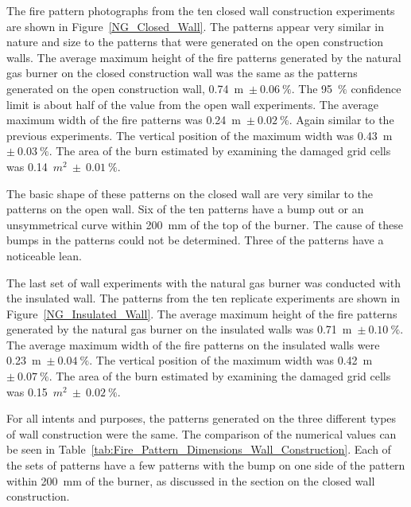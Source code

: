 \documentclass[twoside]{uocthesis}
\begin{document}
The fire pattern photographs from the ten closed wall construction experiments are shown in Figure~\ref{NG_Closed_Wall}. 
The patterns appear very similar in nature and size to the patterns that were generated on the open construction walls.  The average maximum height of the fire patterns generated by the natural gas burner on the closed construction wall was the same as the patterns generated on the open construction wall, 0.74~m~$\pm~0.06~\%$.  The 95~$\%$ confidence limit is about half of the value from the open wall experiments. The average maximum width of the fire patterns was 0.24~m~$\pm~0.02~\%$.  Again similar to the previous experiments. The vertical position of the maximum width was 0.43~m~$\pm~0.03~\%$. The area of the burn estimated by examining the damaged grid cells was 0.14~$m^2~\pm~0.01~\%$.  

The basic shape of these patterns on the closed wall are very similar to the patterns on the open wall.  Six of the ten patterns have a bump out or an unsymmetrical curve within 200~mm of the top of the burner.  The cause of these bumps in the patterns could not be determined. Three of the patterns have a noticeable lean.     
  
The last set of wall experiments with the natural gas burner was conducted with the insulated wall.  The patterns from the ten replicate experiments are shown in Figure~\ref{NG_Insulated_Wall}.  The average maximum height of the fire patterns generated by the natural gas burner on the insulated walls was 0.71~m~$\pm~0.10~\%$.  The average maximum width of the fire patterns on the insulated walls were 0.23~m~$\pm~0.04~\%$.  The vertical position of the maximum width was 0.42~m~$\pm~0.07~\%$. The area of the burn estimated by examining the damaged grid cells was 0.15~$m^2~\pm~0.02~\%$.  


For all intents and purposes, the patterns generated on the three different types of wall construction were the same.  The comparison of the numerical values can be seen in Table~\ref{tab:Fire_Pattern_Dimensions_Wall_Construction}.  Each of the sets of 
patterns have a few patterns with the bump on one side of the pattern within 200~mm of the burner, as discussed in the section on the closed wall construction.     
\end{document}
